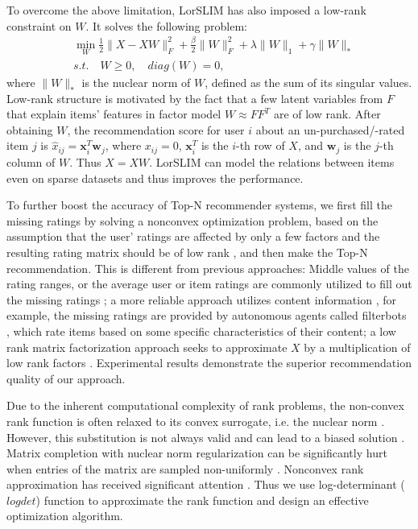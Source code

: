 \documentclass[letterpaper]{article}
\renewcommand{\vec}[1]{\mathbf{#1}}
\begin{document}
To overcome the above limitation, LorSLIM \cite{cheng2014lorslim} has also imposed a low-rank constraint on $W$. It solves the following problem:
\begin{equation*}
\begin{split}
&\min_W \frac{1}{2}\|X-XW\|_F^2+\frac{\beta}{2}\|W\|_F^2+\lambda \|W\|_1+\gamma\|W\|_*    \\
&s.t.\quad W\ge 0, \quad diag(W)=0,   
\end{split}
\label{lorslim}
\end{equation*}
where $\|W\|_*$ is the nuclear norm of $W$, defined as the sum of its singular values. Low-rank structure is motivated by the fact that a few latent variables from $F$ that explain items' features in factor model $W\approx FF^T$ are of low rank. After obtaining $W$, the recommendation score for user $i$ about an un-purchased/-rated item $j$ is $\hat{x}_{ij}=\vec{x}_i^T\vec{w}_j$, where $x_{ij}=0$, $\vec{x}_i^T$ is the $i$-th row of $X$, and $\vec{w}_j$ is the $j$-th column of $W$. Thus $\hat{X}=XW$. %
LorSLIM can model the relations between items even on sparse datasets and thus improves the performance. 

To further boost the accuracy of Top-N recommender systems, we first fill the missing ratings by solving a nonconvex optimization problem, based on the assumption that the user' ratings are affected by only a few factors and the resulting rating matrix should be of low rank \cite{lee2014local}, and then make the Top-N recommendation. This is different from previous approaches: Middle values of the rating ranges, or the average user or item ratings are commonly utilized to fill out the missing ratings \cite{breese1998empirical,deshpande2004item}; a more reliable approach utilizes content information \cite{melville2002content,li2004combining,degemmis2007content}, for example, the missing ratings are provided by autonomous agents called filterbots \cite{good1999combining}, which rate items based on some specific characteristics of their content; a low rank matrix factorization approach seeks to approximate $X$ by a multiplication of low rank factors \cite{yu2009fast}. Experimental results demonstrate the superior recommendation quality of our approach.

Due to the inherent computational complexity of rank problems, the non-convex rank function is often relaxed to its convex surrogate, i.e. the nuclear norm \cite{candes2009exact,recht2008necessary}. However, this substitution is not always valid and can lead to a biased solution \cite{shi2011limitations,kangcikm2015robust}. Matrix completion with nuclear norm regularization can be significantly hurt when entries of the matrix are sampled non-uniformly \cite{srebro2010collaborative}. Nonconvex rank approximation has received significant attention \cite{zhong2015nonconvex,kangICDM}. Thus we use log-determinant ($logdet$) function to approximate the rank function and design an effective optimization algorithm. 
\end{document}
